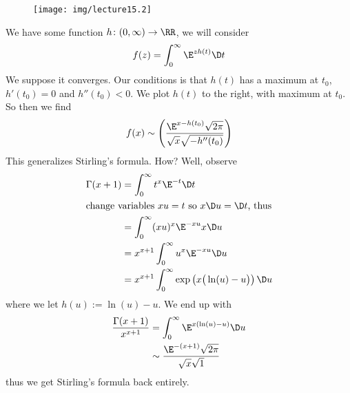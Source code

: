 \begin{wrapfigure}{r}{0.9in}
\vspace{-24pt}
\begin{center}
\texttt{[image: img/lecture15.2]}
\end{center}
\vspace{-20pt}
\end{wrapfigure}
We have some function $h\colon(0,\infty)\to\RR$, we will consider
\begin{equation}
f(z)=\int^{\infty}_{0}\E^{zh(t)}\D t
\end{equation}
We suppose it converges. Our conditions is that $h(t)$ has a
maximum at $t_{0}$, $h'(t_{0})=0$ and $h''(t_{0})<0$.
We plot $h(t)$ to the right, with maximum at $t_{0}$. So then we
find
\begin{equation}
f(x)\asymptote\left(\frac{\E^{x-h(t_{0})}\sqrt{2\pi}}{\sqrt{x}\sqrt{-h''(t_{0})}}\right)
\end{equation}
This generalizes Stirling's formula. How? Well, observe
\begin{subequations}
\begin{align}
\Gamma(x+1) &= \int^{\infty}_{0}t^{x}\E^{-t}\D t\\
\intertext{change variables $xu=t$ so $x\D u=\D t$, thus}
&=\int^{\infty}_{0}(xu)^{x}\E^{-xu}x\D u\\
&=x^{x+1}\int^{\infty}_{0}u^{x}\E^{-xu}\D u\\
&= x^{x+1}\int^{\infty}_{0}\exp\left(x\big(\ln(u)-u\big)\right)\D
u
\end{align}
\end{subequations}
where we let $h(u):=\ln(u)-u$. We end up with
\begin{equation}
\begin{split}
\frac{\Gamma(x+1)}{x^{x+1}} &=\int^{\infty}_{0}\E^{x(\ln(u)-u)}\D u\\
&\asymptote\frac{\E^{-(x+1)}\sqrt{2\pi}}{\sqrt{x}\sqrt{1}}
\end{split}
\end{equation}
thus we get Stirling's formula back entirely.
